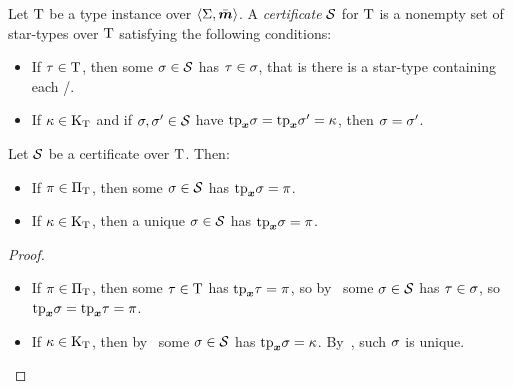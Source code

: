 \begin{definition}
Let $\mathrm{T}$ be a type instance over $\left\langle \mathrm{\Sigma},\bar{\bm{m}} \right\rangle$.
A \emph{certificate} $\mathcal{S}$ for $\mathrm{T}$ is a nonempty set of star-types over
$\mathrm{T}$ satisfying the following conditions:
\begin{itemize}
  \item[\condcertT]\label{cond:certT}
  If $\tau\in\mathrm{T}$, then some $\sigma\in\mathcal{S}$ has $\tau\in\sigma$,
  that is there is a star-type containing each \twotype/.
  \item[\condcertk]\label{cond:certk}
  If $\kappa\in{\mathrm{K}}_{\mathrm{T}}$ and if $\sigma,{\sigma'}\in\mathcal{S}$
  have $\mathrm{tp}_{\bm{x}}\sigma = \mathrm{tp}_{\bm{x}}{\sigma'} = \kappa$, then $\sigma = {\sigma'}$.
\end{itemize}
\end{definition}
\begin{remark}
Let $\mathcal{S}$ be a certificate over $\mathrm{T}$. Then:
\begin{itemize}
  \item[\condcertp]\label{cond:certp}
  If $\pi \in {\Pi}_{\mathrm{T}}$, then some $\sigma\in\mathcal{S}$ has $\mathrm{tp}_{\bm{x}}\sigma = \pi$.
  \item[\condcertku]\label{cond:certku}
  If $\kappa \in {\mathrm{K}}_{\mathrm{T}}$, then a unique $\sigma\in\mathcal{S}$ has $\mathrm{tp}_{\bm{x}}\sigma = \pi$.
\end{itemize}
\end{remark}
\begin{proof}
\begin{itemize}
  \item[\refcondcertp]
  If $\pi\in{\Pi}_{\mathrm{T}}$, then some $\tau\in\mathrm{T}$ has $\mathrm{tp}_{\bm{x}}\tau = \pi$,
  so by~ some $\sigma\in\mathcal{S}$ has $\tau\in\sigma$, so
  $\mathrm{tp}_{\bm{x}}\sigma = \mathrm{tp}_{\bm{x}}\tau = \pi$.
  \item[\refcondcertku]
  If $\kappa\in{\mathrm{K}}_{\mathrm{T}}$, then by~ some $\sigma\in\mathcal{S}$ has
  $\mathrm{tp}_{\bm{x}}\sigma = \kappa$.
  By~, such $\sigma$ is unique.
\end{itemize}
\end{proof}


